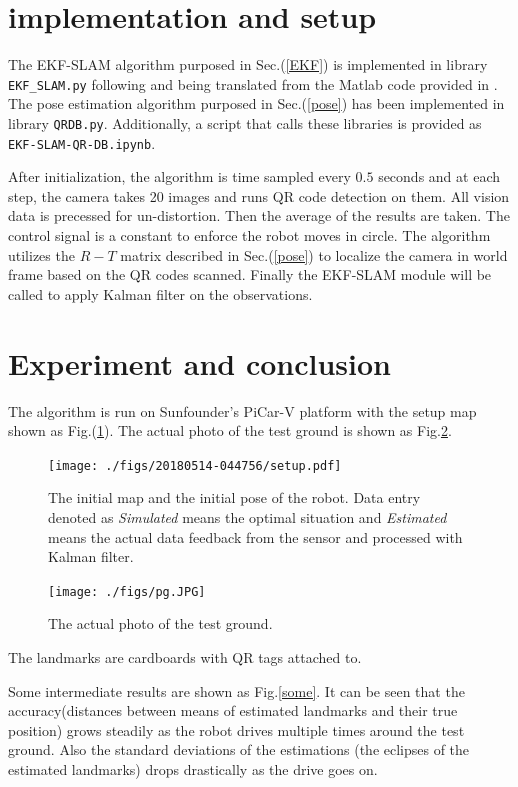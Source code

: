 \documentclass[12pt]{article}
\begin{document}
\section{implementation and setup}

The EKF-SLAM algorithm purposed in Sec.(\ref{EKF}) is implemented in library \texttt{EKF\_SLAM.py} following and being translated from the Matlab code provided in \cite{ekf}. The pose estimation algorithm purposed in Sec.(\ref{pose}) has been implemented in library \texttt{QRDB.py}.  Additionally, a script that calls these libraries is provided as \texttt{EKF-SLAM-QR-DB.ipynb}. 

After initialization, the algorithm is time sampled every $0.5$ seconds and at each step, the camera takes 20 images and runs QR code detection on them. All vision data is precessed for un-distortion. Then the average of the results are taken. The control signal is a constant to enforce the robot moves in circle. The algorithm utilizes the $R-T$ matrix described in Sec.(\ref{pose}) to localize the camera in world frame based on the QR codes scanned.  Finally the EKF-SLAM module will be called to apply Kalman filter on the observations.


\section{Experiment and conclusion}
The algorithm is run on Sunfounder's PiCar-V platform with the setup map shown as Fig.(\ref{setup}).  The actual photo of the test ground is shown as Fig.{\ref{ph}}.
\begin{figure}[htbp]
\centering
\texttt{[image: ./figs/20180514-044756/setup.pdf]}
\caption{The initial map and the initial pose of the robot. Data entry denoted as \textit{Simulated} means the optimal situation and \textit{Estimated} means the actual data feedback from the sensor and processed with Kalman filter.}\label{setup}
\end{figure}
\begin{figure}[htbp]
\centering
\texttt{[image: ./figs/pg.JPG]}
\caption{The actual photo of the test ground. }\label{ph}
\end{figure}
The landmarks are cardboards with QR tags attached to. 

Some intermediate results are shown as Fig.{\ref{some}}. It can be seen that the accuracy(distances between means of estimated landmarks and their true position) grows steadily as the robot drives multiple times around the test ground. Also the standard deviations of the estimations (the eclipses of the estimated landmarks) drops drastically as the drive goes on.
\end{document}
